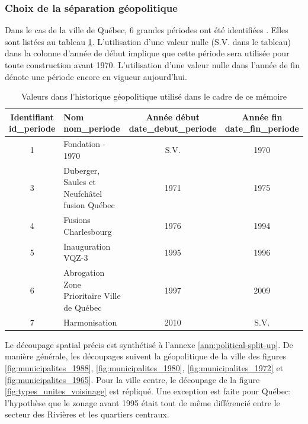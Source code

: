         \subsubsection{Choix de la séparation géopolitique}
            Dans le cas de la ville de Québec, 6 grandes périodes ont été identifiées \parencite{ville_de_quebec_reperes_nodate,elections_quebec_atlas_2021}. Elles sont listées au tableau \ref{tab:histo_geopol}. L'utilisation d'une valeur nulle (S.V. dans le tableau) dans la colonne d'année de début implique que cette période sera utilisée pour toute construction avant 1970. L'utilisation d'une valeur nulle dans l'année de fin dénote une période encore en vigueur aujourd'hui.\par
            \begin{table}[h]
                \caption{Valeurs dans l'historique géopolitique utilisé dans le cadre de ce mémoire}\label{tab:histo_geopol}
                \centering
                \begin{tabular}{c p{5cm} c c}
                    \hline
                    \makecell{Identifiant\\ id\_periode} & \makecell[l]{Nom \\ nom\_periode} & \makecell{Année début \\ date\_debut\_periode} & \makecell{Année fin \\ date\_fin\_periode}\\ \hline
                    1 & Fondation - 1970 &  S.V. & 1970 \\
                    3 & Duberger, Saules et Neufchâtel fusion Québec & 1971 & 1975 \\
                    4 & Fusions Charlesbourg & 1976 & 1994 \\
                    5 & Inauguration VQZ-3 & 1995 & 1996 \\
                    6 & Abrogation Zone Prioritaire Ville de Québec & 1997 & 2009 \\
                    7 & Harmonisation & 2010 & S.V.\\ \hline
                \end{tabular}
            \end{table}
            Le découpage spatial précis est synthétisé à l'annexe \ref{ann:political-split-up}. De manière générale, les découpages suivent la géopolitique de la ville des figures \ref{fig:municipalites_1988}, \ref{fig:municipalites_1980}, \ref{fig:municipalites_1972} et \ref{fig:municipalites_1965}. Pour la ville centre, le découpage de la figure \ref{fig:types_unites_voisinage} est répliqué. Une exception est faite pour Québec: l'hypothèse que le zonage avant 1995 était tout de même différencié entre le secteur des Rivières et les quartiers centraux. 
            
